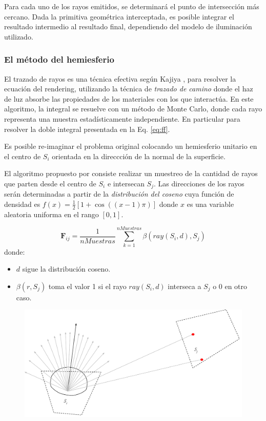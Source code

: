 Para cada uno de los rayos emitidos, se determinará el punto de intersección más cercano. Dada la primitiva geométrica interceptada, es posible integrar el resultado intermedio al resultado final, dependiendo del modelo de iluminación utilizado.

\subsubsection{El método del hemiesferio}

El trazado de rayos es una técnica efectiva según Kajiya \cite{Kajiya}, para resolver la ecuación del rendering, utilizando la técnica de \textit{trazado de camino} donde el haz de luz absorbe las propiedades de los materiales con los que interactúa. En este algoritmo, la integral se resuelve con un método de Monte Carlo, donde cada rayo representa una muestra estadísticamente independiente. En particular para resolver la doble integral presentada en la Eq. \eqref{eq:ff}.

Es posible re-imaginar el problema original colocando un hemiesferio unitario en el centro de $S_{i}$ orientada en la direccción de la normal de la superficie.

El algoritmo propuesto por \citeauthor{Malley}  consiste realizar un muestreo de la cantidad de  rayos que parten desde el centro de $S_{i}$ e intersecan $S_{j}$. Las direcciones de los rayos serán determinadas a partir de la \textit{distribución del coseno} cuya función de densidad es $f(x) = \frac{1}{2}[1 + \cos((x-1)\pi)]$ donde $x$ es una variable aleatoria uniforma en el rango $[0,1]$.

\begin{equation}
	\mathbf{F}_{ij} = \frac{1}{nMuestras} \sum_{k=1}^{nMuestras} {\beta(ray(S_{i},d), S_{j})}
	\label{eq:ffhemiesfera}
\end{equation}
donde: \begin{itemize}
		\item  $d$ sigue la distribución coseno.
		\item $\beta(r, S_{j})$ toma el valor 1 si el rayo $ray(S_{i},d)$ interseca a $S_{j}$ o $0$ en otro caso.
	   \end{itemize}
\clearpage

\vspace{5mm}
\begin{figure}[htbp]
	\centering
	\includegraphics[width=\linewidth]{assets/Raytracing}
	\label{img:ff}
\end{figure}

